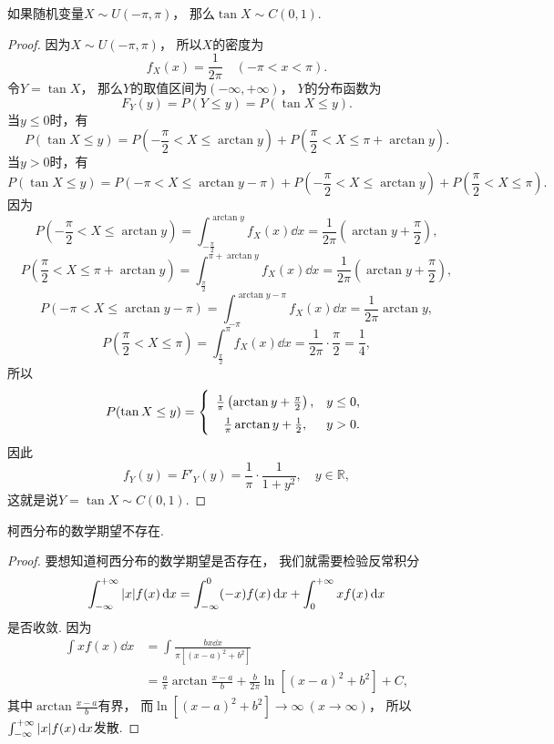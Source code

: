 \begin{proposition}
如果随机变量\(X \sim U(-\pi,\pi)\)，
那么\(\tan X \sim C(0,1)\).
\begin{proof}
因为\(X \sim U(-\pi,\pi)\)，
所以\(X\)的密度为\[
	f_X(x) = \frac{1}{2\pi}
	\quad(-\pi<x<\pi).
\]
令\(Y = \tan X\)，
那么\(Y\)的取值区间为\((-\infty,+\infty)\)，
\(Y\)的分布函数为\[
	F_Y(y)
	= P(Y \leq y)
	= P(\tan X \leq y).
\]
当\(y\leq0\)时，有\[
	P(\tan X \leq y)
	= P\left(-\frac\pi2 < X \leq \arctan y\right)
	+ P\left(\frac\pi2 < X \leq \pi + \arctan y\right).
\]
当\(y>0\)时，有\[
	P(\tan X \leq y)
	= P\left(-\pi < X \leq \arctan y - \pi\right)
	+ P\left(-\frac\pi2 < X \leq \arctan y\right)
	+ P\left(\frac\pi2 < X \leq \pi\right).
\]
因为\[
	P\left(-\frac\pi2 < X \leq \arctan y\right)
	= \int_{-\frac\pi2}^{\arctan y} f_X(x) \dd{x}
	= \frac{1}{2\pi} \left(\arctan y + \frac\pi2\right),
\]\[
	P\left(\frac\pi2 < X \leq \pi + \arctan y\right)
	= \int_{\frac\pi2}^{\pi + \arctan y} f_X(x) \dd{x}
	= \frac{1}{2\pi} \left(\arctan y + \frac\pi2\right),
\]\[
	P\left(-\pi < X \leq \arctan y - \pi\right)
	= \int_{-\pi}^{\arctan y - \pi} f_X(x) \dd{x}
	= \frac{1}{2\pi} \arctan y,
\]\[
	P\left(\frac\pi2 < X \leq \pi\right)
	= \int_{\frac\pi2}^\pi f_X(x) \dd{x}
	= \frac{1}{2\pi} \cdot \frac\pi2
	= \frac14,
\]
所以\[
	P(\tan X \leq y)
	= \left\{ \def\arraystretch{1.5} \begin{array}{cl}
		\frac1\pi \left(\arctan y + \frac\pi2\right), & y\leq0, \\
		\frac1\pi \arctan y + \frac12, & y>0.
	\end{array} \right.
\]
因此\[
	f_Y(y) = F'_Y(y)
	= \frac1\pi \cdot \frac{1}{1+y^2},
	\quad y\in\mathbb{R},
\]
这就是说\(Y = \tan X \sim C(0,1)\).
\end{proof}
\end{proposition}

\begin{proposition}
柯西分布的数学期望不存在.
\begin{proof}
要想知道柯西分布的数学期望是否存在，
我们就需要检验反常积分\[
	\int_{-\infty}^{+\infty} \abs{x} f(x) \dd{x}
	= \int_{-\infty}^0 (-x) f(x) \dd{x}
	+ \int_0^{+\infty} x f(x) \dd{x}
\]是否收敛.
因为\begin{align*}
	\int x f(x) \dd{x}
	&= \int \frac{b x \dd{x}}{\pi[(x-a)^2+b^2]} \\
	&= \frac{a}{\pi} \arctan\frac{x-a}{b} + \frac{b}{2\pi} \ln[(x-a)^2+b^2] + C,
\end{align*}
其中\(\arctan\frac{x-a}{b}\)有界，
而\(\ln[(x-a)^2+b^2]\to\infty\ (x\to\infty)\)，
所以\(\int_{-\infty}^{+\infty} \abs{x} f(x) \dd{x}\)发散.
\end{proof}
\end{proposition}

